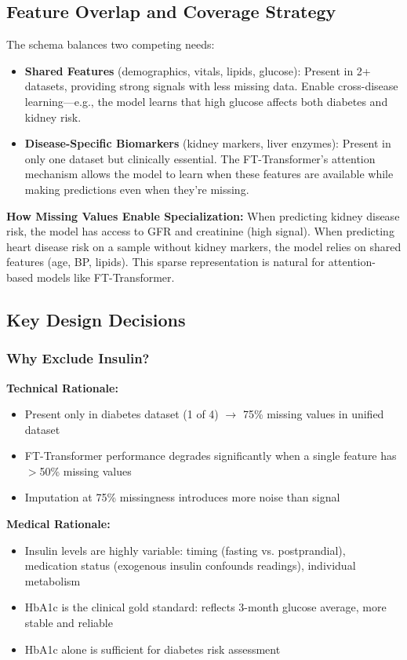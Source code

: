 \documentclass[11pt,a4paper]{article}
\begin{document}
\subsection{Feature Overlap and Coverage Strategy}

The schema balances two competing needs:
\begin{itemize}
    \item \textbf{Shared Features} (demographics, vitals, lipids, glucose): Present in 2+ datasets, providing strong signals with less missing data. Enable cross-disease learning—e.g., the model learns that high glucose affects both diabetes and kidney risk.
    \item \textbf{Disease-Specific Biomarkers} (kidney markers, liver enzymes): Present in only one dataset but clinically essential. The FT-Transformer's attention mechanism allows the model to learn when these features are available while making predictions even when they're missing.
\end{itemize}

\textbf{How Missing Values Enable Specialization:} When predicting kidney disease risk, the model has access to GFR and creatinine (high signal). When predicting heart disease risk on a sample without kidney markers, the model relies on shared features (age, BP, lipids). This sparse representation is natural for attention-based models like FT-Transformer.

\subsection{Key Design Decisions}

\subsubsection{Why Exclude Insulin?}

\textbf{Technical Rationale:}
\begin{itemize}
    \item Present only in diabetes dataset (1 of 4) $\rightarrow$ 75\% missing values in unified dataset
    \item FT-Transformer performance degrades significantly when a single feature has $>$50\% missing values
    \item Imputation at 75\% missingness introduces more noise than signal
\end{itemize}

\textbf{Medical Rationale:}
\begin{itemize}
    \item Insulin levels are highly variable: timing (fasting vs. postprandial), medication status (exogenous insulin confounds readings), individual metabolism
    \item HbA1c is the clinical gold standard: reflects 3-month glucose average, more stable and reliable
    \item HbA1c alone is sufficient for diabetes risk assessment
\end{itemize}
\end{document}
